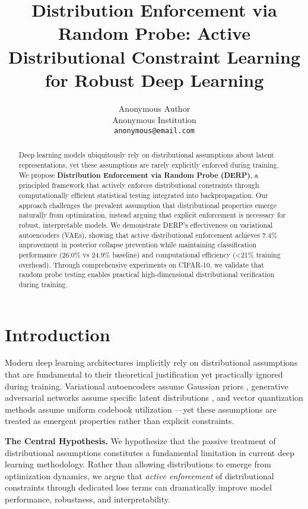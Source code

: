 \documentclass{article}
\title{Distribution Enforcement via Random Probe: Active Distributional Constraint Learning for Robust Deep Learning}
\author{%
  Anonymous Author\\
  Anonymous Institution\\
  \texttt{anonymous@email.com}
}
\begin{document}
\maketitle

\begin{abstract}
Deep learning models ubiquitously rely on distributional assumptions about latent representations, yet these assumptions are rarely explicitly enforced during training. We propose \textbf{Distribution Enforcement via Random Probe (DERP)}, a principled framework that actively enforces distributional constraints through computationally efficient statistical testing integrated into backpropagation. Our approach challenges the prevalent assumption that distributional properties emerge naturally from optimization, instead arguing that explicit enforcement is necessary for robust, interpretable models. We demonstrate DERP's effectiveness on variational autoencoders (VAEs), showing that active distributional enforcement achieves 7.4\% improvement in posterior collapse prevention while maintaining classification performance (26.0\% vs 24.9\% baseline) and computational efficiency (<21\% training overhead). Through comprehensive experiments on CIFAR-10, we validate that random probe testing enables practical high-dimensional distributional verification during training.
\end{abstract}

\section{Introduction}

Modern deep learning architectures implicitly rely on distributional assumptions that are fundamental to their theoretical justification yet practically ignored during training. Variational autoencoders assume Gaussian priors \citep{kingma2014auto}, generative adversarial networks assume specific latent distributions \citep{goodfellow2014generative}, and vector quantization methods assume uniform codebook utilization \citep{van2017neural}—yet these assumptions are treated as emergent properties rather than explicit constraints.

\textbf{The Central Hypothesis.} We hypothesize that the passive treatment of distributional assumptions constitutes a fundamental limitation in current deep learning methodology. Rather than allowing distributions to emerge from optimization dynamics, we argue that \emph{active enforcement} of distributional constraints through dedicated loss terms can dramatically improve model performance, robustness, and interpretability.
\end{document}
